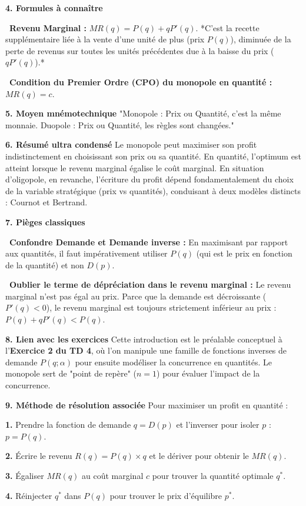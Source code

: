 \documentclass[11pt, a4paper]{report}
\begin{document}
\textbf{4. Formules à connaître}
\par \textbullet\ \textbf{Revenu Marginal :} $MR(q) = P(q) + qP'(q)$. *C'est la recette supplémentaire liée à la vente d'une unité de plus (prix $P(q)$), diminuée de la perte de revenus sur toutes les unités précédentes due à la baisse du prix ($qP'(q)$).*
\par \textbullet\ \textbf{Condition du Premier Ordre (CPO) du monopole en quantité :} $MR(q) = c$. 

\textbf{5. Moyen mnémotechnique}
"Monopole : Prix ou Quantité, c'est la même monnaie. Duopole : Prix ou Quantité, les règles sont changées."

\textbf{6. Résumé ultra condensé}
Le monopole peut maximiser son profit indistinctement en choisissant son prix ou sa quantité. En quantité, l'optimum est atteint lorsque le revenu marginal égalise le coût marginal. En situation d'oligopole, en revanche, l'écriture du profit dépend fondamentalement du choix de la variable stratégique (prix vs quantités), conduisant à deux modèles distincts : Cournot et Bertrand.

\textbf{7. Pièges classiques}
\par \textbullet\ \textbf{Confondre Demande et Demande inverse :} En maximisant par rapport aux quantités, il faut impérativement utiliser $P(q)$ (qui est le prix en fonction de la quantité) et non $D(p)$.
\par \textbullet\ \textbf{Oublier le terme de dépréciation dans le revenu marginal :} Le revenu marginal n'est pas égal au prix. Parce que la demande est décroissante ($P'(q)<0$), le revenu marginal est toujours strictement inférieur au prix : $P(q) + qP'(q) < P(q)$.

\textbf{8. Lien avec les exercices}
Cette introduction est le préalable conceptuel à l'\textbf{Exercice 2 du TD 4}, où l'on manipule une famille de fonctions inverses de demande $P(q;\alpha)$ pour ensuite modéliser la concurrence en quantités. Le monopole sert de "point de repère" ($n=1$) pour évaluer l'impact de la concurrence.

\textbf{9. Méthode de résolution associée}
Pour maximiser un profit en quantité :
\par \textbf{1.} Prendre la fonction de demande $q = D(p)$ et l'inverser pour isoler $p$ : $p = P(q)$.
\par \textbf{2.} Écrire le revenu $R(q) = P(q) \times q$ et le dériver pour obtenir le $MR(q)$.
\par \textbf{3.} Égaliser $MR(q)$ au coût marginal $c$ pour trouver la quantité optimale $q^*$.
\par \textbf{4.} Réinjecter $q^*$ dans $P(q)$ pour trouver le prix d'équilibre $p^*$.
\end{document}
